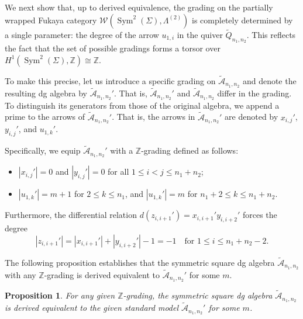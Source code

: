 \documentclass[a4paper, reqno, 11pt]{amsart}
\newtheorem{proposition}[theorem]{Proposition}
\theoremstyle{definition}
\begin{document}
We next show that, up to derived equivalence, the grading on the partially wrapped Fukaya category $\mathcal{W}(\operatorname{Sym}^2(\Sigma), \Lambda^{(2)})$ is completely determined by a single parameter: the degree of the arrow $u_{1,i}$ in the quiver $\widetilde{Q}_{n_1, n_2}$. This reflects the fact that the set of possible gradings forms a torsor over $H^1(\operatorname{Sym}^2(\Sigma), \mathbb{Z}) \cong \mathbb{Z}$. 

To make this precise, let us introduce a specific grading on $\widetilde{\mathcal A}_{n_1,n_2}$ and denote the resulting dg algebra by   $\widetilde{\mathcal{A}}_{n_1,n_2}'$. That is, $\widetilde{\mathcal{A}}_{n_1,n_2}'$ and  $\widetilde{\mathcal{A}}_{n_1,n_2}$  differ in the grading. To distinguish its generators from those of the original algebra, we append a prime to the arrows of $\widetilde{\mathcal{A}}_{n_1,n_2}'$. That is, the arrows in $\widetilde{\mathcal{A}}_{n_1,n_2}'$ are denoted by $x_{i,j}'$, $y_{i,j}'$, and $u_{1,k}'$.

Specifically, we equip $\widetilde{\mathcal{A}}_{n_1,n_2}'$ with a $\mathbb{Z}$-grading defined as follows:
\begin{itemize}[leftmargin=*, label=--]
	\item $|x_{i,j}'| = 0$ and $|y_{i,j}'| = 0$ for all $1 \leq i < j \leq n_1+n_2$;
	\item $|u_{1,k}'| = m+1$ for $2 \leq k \leq n_1$, and $|u_{1,k}'| = m$ for $n_1+2 \leq k \leq n_1+n_2$.
\end{itemize}
Furthermore, the differential relation $d(z_{i,i+1}') = x_{i,i+1}'y_{i,i+2}'$ forces the degree $$|z_{i,i+1}'| = |x_{i,i+1}'| + |y_{i,i+2}'| - 1 = -1\quad \text{for $1\leq i \leq n_1+n_2-2$}.$$

The following proposition establishes that the symmetric square dg algebra $\widetilde{\mathcal{A}}_{n_1,n_2}$ with any $\mathbb{Z}$-grading is derived equivalent to $\widetilde{\mathcal{A}}_{n_1,n_2}'$ for some $m$.


\begin{proposition}\label{prop:grading_derived_equiv}
	For any given $\mathbb{Z}$-grading, the symmetric square dg algebra $\widetilde{\mathcal{A}}_{n_1,n_2}$ is derived equivalent to the given standard model $\widetilde{\mathcal{A}}_{n_1,n_2}'$ for some $m$.  
\end{proposition}
\end{document}
